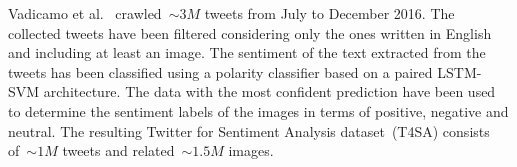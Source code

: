 Vadicamo et al.~\cite{vadicamo2017cross} crawled~$\sim3M$ tweets from July to December 2016. The collected tweets have been filtered considering only the ones written in English and including at least an image. 
The sentiment of the text extracted from the tweets has been classified using a polarity classifier based on a paired LSTM-SVM architecture. The data with the most confident prediction have been used to determine the sentiment labels of the images in terms of positive, negative and neutral. The resulting Twitter for Sentiment Analysis dataset~(T4SA) consists of~$\sim1M$ tweets and related~$\sim1.5M$ images.
\\
\begin{table}[]
	\small
	\centering
	\caption{Main benchmark datasets for Visual Sentiment Analysis. Some datasets contains several additional information and annotations.}
	\label{tabDataset}
\end{table}
